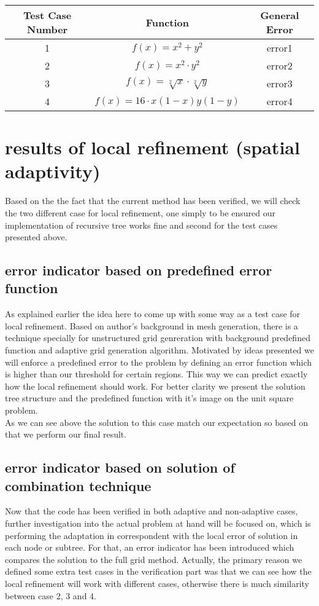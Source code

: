 \begin{center}
 \begin{tabular}{| c | c | c |}
\hline
 Test Case Number & Function &  General Error\\
 \hline
 1 & $f(x)=x^2+y^2$ & error1\\
 \hline
 2 & $f(x)=x^2 \cdot y^2 $ & error2\\
 \hline
 3 & $f(x)=\sqrt[2]{x} \cdot \sqrt[2]{y}$ & error3\\
 \hline
 4 & $f(x)=16 \cdot x(1-x)y(1-y)$ & error4\\
 \hline
 \end{tabular}
\end{center}

\section{results of local refinement (spatial adaptivity)}
Based on the the fact that the current method has been verified, we will check the two different case for local refinement, one simply to be ensured our implementation of recursive tree works fine and second for the test cases presented above. 
\subsection{error indicator based on predefined error function}
As explained earlier the idea here to come up with some way as a test case for local refinement. Based on author's background in mesh generation, there is a technique specially for unstructured grid genreration with background predefined function \cite{Henshaw1996} and adaptive grid generation algorithm\cite{Ebeida2010}. Motivated by ideas presented we will enforce a predefined error to the problem by defining an error function which is higher than our threshold for certain regions. This way we can predict exactly how the local refinement should work. For better clarity we present the solution tree structure and the predefined function with it's image on the unit square problem.\\

As we can see above the solution to this case match our expectation so based on that we perform our final result.
\subsection{error indicator based on solution of combination technique}
Now that the code has been verified in both adaptive and non-adaptive cases, further investigation into the actual problem at hand will be focused on, which is performing the adaptation in correspondent with the local error of solution in each node or subtree. For that, an error indicator has been introduced which compares the solution to the full grid method. Actually, the primary reason we defined some extra test cases in the verification part was that we can see how the local refinement will work with different cases, otherwise there is much similarity between case 2, 3 and 4. \\

